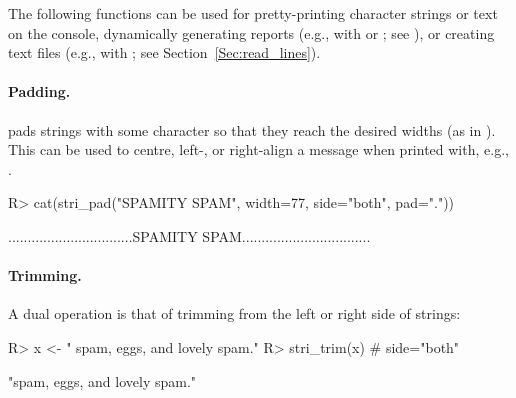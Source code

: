 \documentclass[nojss]{jss}
\begin{document}
The following functions can be used for pretty-printing
character strings or text on the console,
dynamically generating reports (e.g.,
with  or ; see \citealp{knitr}),
or creating text files
(e.g., with ; see Section~\ref{Sec:read_lines}).



\paragraph{Padding.}
 pads strings with some character so that they
reach the desired widths (as in ).
This can be used to centre, left-, or right-align a message
when printed with, e.g.,  .


\begin{Schunk}
\begin{Sinput}
R> cat(stri_pad("SPAMITY SPAM", width=77, side="both", pad="."))
\end{Sinput}
\begin{Soutput}
................................SPAMITY SPAM.................................
\end{Soutput}
\end{Schunk}







\paragraph{Trimming.}
A dual operation is that of trimming from the left or right side
of strings:

\begin{Schunk}
\begin{Sinput}
R> x <- "      spam, eggs, and lovely spam.\n"
R> stri_trim(x)  # side="both"
\end{Sinput}
\begin{Soutput}
[1] "spam, eggs, and lovely spam."
\end{Soutput}
\end{Schunk}

\end{document}
